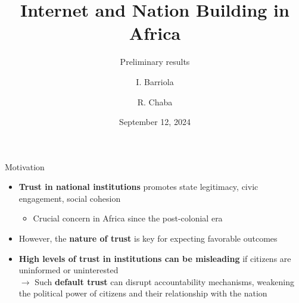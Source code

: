 \documentclass[10pt]{beamer}
\begin{document}
\author[I. Barriola, R. Chaba]{I. Barriola \and R. Chaba}

\title{Internet and Nation Building in Africa}
\subtitle{Preliminary results}
\date{September 12, 2024}

\begin{frame}
    \titlepage
\end{frame}

    

\begin{frame}{Motivation}
    \begin{itemize}\setlength\itemsep{1em}
        \item \textbf{Trust in national institutions} promotes state legitimacy, civic engagement, social cohesion
        \begin{itemize}
            \item Crucial concern in Africa since the post-colonial era
        \end{itemize}
        \item However, the \textbf{nature of trust} is key for expecting favorable outcomes
        \item  \textbf{High levels of trust in institutions can be misleading} if citizens are uninformed or uninterested\\ \vspace{1em}
        $\rightarrow{}$ Such \textbf{default trust} can disrupt accountability mechanisms, weakening the political power of citizens and their relationship with the nation        %
    \end{itemize}
\end{frame}
\end{document}
